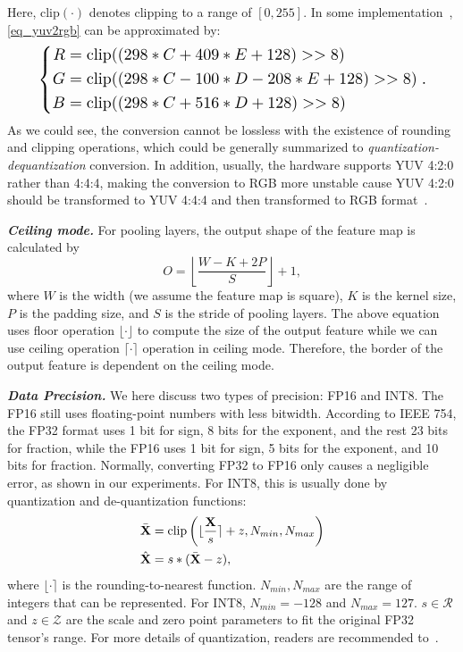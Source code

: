 Here, $\mathrm{clip}(\cdot)$ denotes clipping to a range of $[0, 255]$. In some implementation~\cite{wiki_yuv}, \autoref{eq_yuv2rgb} can be approximated by:
\begin{equation}
\resizebox{0.9\linewidth}{!}{$
\left\{
\begin{aligned}
R & = \mathrm{clip}(( 298 * C           + 409 * E + 128) >> 8) \\
G & = \mathrm{clip}(( 298 * C - 100 * D - 208 * E + 128) >> 8) \\
B & = \mathrm{clip}(( 298 * C + 516 * D           + 128) >> 8)
\end{aligned}
\right..
$}
\end{equation}
As we could see, the conversion cannot be lossless with the existence of rounding and clipping operations, which could be generally summarized to \emph{quantization-dequantization} conversion. In addition, usually, the hardware supports YUV 4:2:0 rather than 4:4:4, making the conversion to RGB more unstable cause YUV 4:2:0 should be transformed to YUV 4:4:4 and then transformed to RGB format~\cite{wood2005rec}.  


\textbf{\emph{Ceiling mode.}} For pooling layers, the output shape of the feature map is calculated by
\begin{equation}
    O = \left\lfloor \frac{W-K+2P}{S} \right\rfloor + 1,
    \label{eq_ceilmode}
\end{equation}
where $W$ is the width (we assume the feature map is square), $K$ is the kernel size, $P$ is the padding size, and $S$ is the stride of pooling layers. The above equation uses floor operation $\lfloor \cdot \rfloor$ to compute the size of the output feature while we can use ceiling operation $\lceil \cdot \rceil$ operation in ceiling mode. Therefore, the border of the output feature is dependent on the ceiling mode. 

\textbf{\emph{Data Precision.}} We here discuss two types of precision: FP16 and INT8. The FP16 still uses floating-point numbers with less bitwidth. According to IEEE 754, the FP32 format uses 1 bit for sign, 8 bits for the exponent, and the rest 23 bits for fraction, while the FP16 uses 1 bit for sign, 5 bits for the exponent, and 10 bits for fraction. Normally, converting FP32 to FP16 only causes a negligible error, as shown in our experiments. For INT8, this is usually done by quantization and de-quantization functions:
\begin{align}
    \bar{{\mathbf{X}}} &= \mathrm{clip}\left(\lfloor\frac{{\mathbf{X}}}{s}\rceil +z, N_{min}, N_{max}\right) \\
    \hat{{\mathbf{X}}} &= s * (\bar{{\mathbf{X}}} - z),
\end{align}
where $\lfloor\cdot\rceil$ is the rounding-to-nearest function. $N_{min}, N_{max}$ are the range of integers that can be represented. For INT8, $N_{min}=-128$ and $N_{max}=127$. $s\in\mathcal{R}$ and $z\in\mathcal{Z}$ are the scale and zero point parameters to fit the original FP32 tensor's range. For more details of quantization, readers are recommended to~\cite{li2021mqbench}. 


